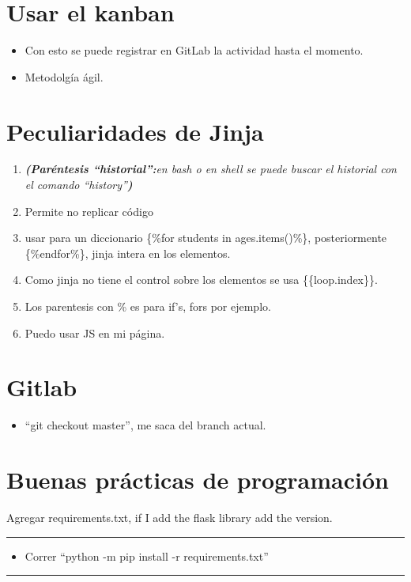 \section{Usar el kanban}
\begin{itemize}
    \item Con esto se puede registrar en GitLab la actividad hasta el momento.
    \item Metodolgía ágil.
\end{itemize}

\section{Peculiaridades de Jinja}
\begin{enumerate} 
    \item \emph{\textbf{(Paréntesis ``historial'':}en bash o en shell se puede buscar el historial con el comando ``history''\textbf{)}}
    \item Permite no replicar código
    \item usar para un diccionario \{\%for students in ages.items()\%\}, posteriormente \{\%endfor\%\}, jinja intera en los elementos.
    \item Como jinja no tiene el control sobre los elementos se usa \{\{loop.index\}\}.
    \item Los parentesis con \% es para if's, fors por ejemplo.
    \item Puedo usar JS en mi página.
\end{enumerate}


\section{Gitlab}
\begin{itemize}
    \item ``git checkout master'', me saca del branch actual.
\end{itemize}

\section{Buenas prácticas de programación}
Agregar requirements.txt, if I add the flask library add the version.
\rule{16cm}{1pt}\newline 
\begin{itemize}
    \item Correr ``python -m pip install -r requirements.txt'' 
\end{itemize}
\rule{16cm}{1pt}\newline 

